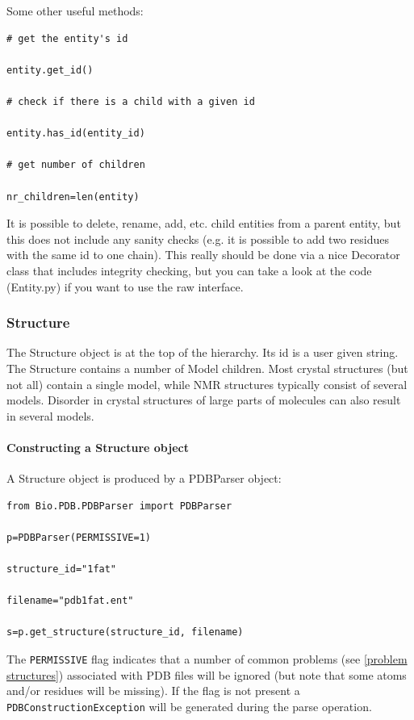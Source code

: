 \documentclass{report}
\begin{document}
Some other useful methods:

\begin{verbatim}
# get the entity's id

entity.get_id()

# check if there is a child with a given id

entity.has_id(entity_id)

# get number of children

nr_children=len(entity)
\end{verbatim}

It is possible to delete, rename, add, etc. child entities from a parent entity,
but this does not include any sanity checks (e.g. it is possible to add two
residues with the same id to one chain). This really should be done via a nice
Decorator class that includes integrity checking, but you can take a look at
the code (Entity.py) if you want to use the raw interface.

\subsubsection{Structure}

The Structure object is at the top of the hierarchy. Its id is a user given
string. The Structure contains a number of Model children. Most crystal structures
(but not all) contain a single model, while NMR structures typically consist
of several models. Disorder in crystal structures of large parts of molecules
can also result in several models.

\paragraph{Constructing a Structure object}

A Structure object is produced by a PDBParser object:

\begin{verbatim}
from Bio.PDB.PDBParser import PDBParser

p=PDBParser(PERMISSIVE=1)

structure_id="1fat"

filename="pdb1fat.ent"

s=p.get_structure(structure_id, filename)
\end{verbatim}

The {\tt PERMISSIVE} flag indicates that a number of common problems (see \ref{problem structures})
associated with PDB files will be ignored (but note that some atoms and/or residues
will be missing). If the flag is not present a {\tt PDBConstructionException}
will be generated during the parse operation.
\end{document}
